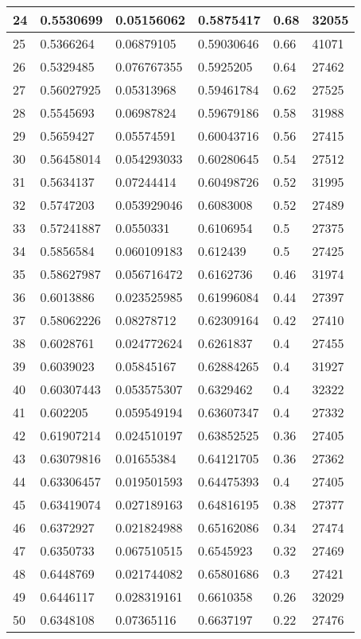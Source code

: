 \begin{longtable}{|l|l|l|l|l|l|}
24 & 0.5530699 & 0.05156062 & 0.5875417 & 0.68 & 32055 \\ \hline 
25 & 0.5366264 & 0.06879105 & 0.59030646 & 0.66 & 41071 \\ \hline 
26 & 0.5329485 & 0.076767355 & 0.5925205 & 0.64 & 27462 \\ \hline 
27 & 0.56027925 & 0.05313968 & 0.59461784 & 0.62 & 27525 \\ \hline 
28 & 0.5545693 & 0.06987824 & 0.59679186 & 0.58 & 31988 \\ \hline 
29 & 0.5659427 & 0.05574591 & 0.60043716 & 0.56 & 27415 \\ \hline 
30 & 0.56458014 & 0.054293033 & 0.60280645 & 0.54 & 27512 \\ \hline 
31 & 0.5634137 & 0.07244414 & 0.60498726 & 0.52 & 31995 \\ \hline 
32 & 0.5747203 & 0.053929046 & 0.6083008 & 0.52 & 27489 \\ \hline 
33 & 0.57241887 & 0.0550331 & 0.6106954 & 0.5 & 27375 \\ \hline 
34 & 0.5856584 & 0.060109183 & 0.612439 & 0.5 & 27425 \\ \hline 
35 & 0.58627987 & 0.056716472 & 0.6162736 & 0.46 & 31974 \\ \hline 
36 & 0.6013886 & 0.023525985 & 0.61996084 & 0.44 & 27397 \\ \hline 
37 & 0.58062226 & 0.08278712 & 0.62309164 & 0.42 & 27410 \\ \hline 
38 & 0.6028761 & 0.024772624 & 0.6261837 & 0.4 & 27455 \\ \hline 
39 & 0.6039023 & 0.05845167 & 0.62884265 & 0.4 & 31927 \\ \hline 
40 & 0.60307443 & 0.053575307 & 0.6329462 & 0.4 & 32322 \\ \hline 
41 & 0.602205 & 0.059549194 & 0.63607347 & 0.4 & 27332 \\ \hline 
42 & 0.61907214 & 0.024510197 & 0.63852525 & 0.36 & 27405 \\ \hline 
43 & 0.63079816 & 0.01655384 & 0.64121705 & 0.36 & 27362 \\ \hline 
44 & 0.63306457 & 0.019501593 & 0.64475393 & 0.4 & 27405 \\ \hline 
45 & 0.63419074 & 0.027189163 & 0.64816195 & 0.38 & 27377 \\ \hline 
46 & 0.6372927 & 0.021824988 & 0.65162086 & 0.34 & 27474 \\ \hline 
47 & 0.6350733 & 0.067510515 & 0.6545923 & 0.32 & 27469 \\ \hline 
48 & 0.6448769 & 0.021744082 & 0.65801686 & 0.3 & 27421 \\ \hline 
49 & 0.6446117 & 0.028319161 & 0.6610358 & 0.26 & 32029 \\ \hline 
50 & 0.6348108 & 0.07365116 & 0.6637197 & 0.22 & 27476 \\ \hline 
\end{longtable}